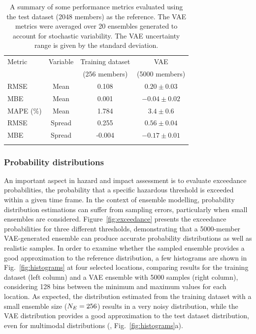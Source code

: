 \begin{table}[t]
  \caption{
    A summary of some performance metrics evaluated using the test dataset (2048 members) as the reference.
    The VAE metrics were averaged over 20 ensembles generated to account for stochastic variability.
    The VAE uncertainty range is given by the standard deviation.
  }
  \label{tab:metrics}
  \begin{tabular}{lccc}
    \tophline
    Metric    & Variable  & Training dataset  & VAE  \\
              &           & (256 members)     & (5000 members)\\
    \middlehline
    RMSE      & Mean      & 0.108             & $0.20  \pm 0.03$   \\
    MBE       & Mean      & 0.001             & $-0.04 \pm 0.02$   \\
    MAPE (\%) & Mean      & 1.784             & $3.4   \pm 0.6$    \\ \middlehline
    RMSE      & Spread    & 0.255             & $0.56  \pm 0.04$   \\
    MBE       & Spread    & -0.004            & $-0.17 \pm 0.01$   \\
    \bottomhline
  \end{tabular}
\end{table}

\subsubsection{Probability distributions} \label{sec:res:pd}
An important aspect in hazard and impact assessment is to evaluate exceedance probabilities, \ie the probability that a specific hazardous threshold is exceeded within a given time frame. In the context of ensemble modelling, probability distribution estimations can suffer from sampling errors, particularly when small ensembles are considered. Figure~\ref{fig:exceedance} presents the exceedance probabilities for three different thresholds, demonstrating that a 5000-member VAE-generated ensemble can produce accurate probability distributions as well as realistic samples.
%
In order to examine whether the sampled ensemble provides a good approximation to the reference distribution, a few histograms are shown in Fig.~\ref{fig:histograms} at four selected locations, comparing results for the training dataset (left column) and a VAE ensemble with 5000 samples (right column), considering 128 bins between the minimum and maximum values for each location. As expected, the distribution estimated from the training dataset with a small ensemble size ($N_E=256$) results in a very noisy distribution, while the VAE distribution provides a good approximation to the test dataset distribution, even for multimodal distributions (\eg, Fig.~\ref{fig:histograms}a).

